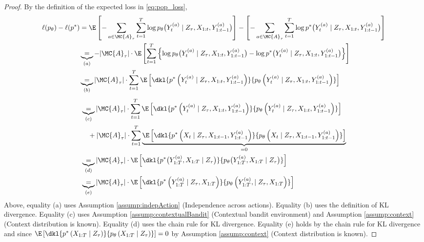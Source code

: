 \begin{proof}
By the definition of the expected loss in  \eqref{eq:pop_loss},
\begin{align*}
    \ell(p_\theta) - \ell(p^*) &= \E \left[ - \sum_{a \in \MC{A}_{\tau}} \sum_{t=1}^T \log p_{\theta} \big( Y_t^{(a)} \mid Z_{\tau}, X_{1:t}, Y_{1:t-1}^{(a)} \big) \right] 
    - \left[ - \sum_{a \in \MC{A}_{\tau}} \sum_{t=1}^T \log p^* \big( Y_t^{(a)} \mid Z_{\tau}, X_{1:t}, Y_{1:t-1}^{(a)} \big) \right] \\
    &\underbrace{=}_{(a)} - |\MC{A}_{\tau}| \cdot \E \left[ \sum_{t=1}^T \left\{ \log p_{\theta} \big( Y_t^{(a)} \mid Z_{\tau}, X_{1:t}, Y_{1:t-1}^{(a)} \big) - \log p^* \big( Y_t^{(a)} \mid Z_{\tau}, X_{1:t}, Y_{1:t-1}^{(a)} \big) \right\} \right] \\
    &\underbrace{=}_{(b)} |\MC{A}_{\tau}| \cdot \sum_{t=1}^T \E \left[ \dkl{p^* \left( Y_t^{(a)} \mid Z_{\tau}, X_{1:t}, Y_{1:t-1}^{(a)} \right)}{p_\theta \left( Y_t^{(a)} \mid Z_{\tau}, X_{1:t}, Y_{1:t-1}^{(a)} \right)} \right] 
\end{align*}
\begin{align*}
    &\underbrace{=}_{(c)} |\MC{A}_{\tau}| \cdot \sum_{t=1}^T \E \left[ \dkl{p^* \left( Y_t^{(a)} \mid Z_{\tau}, X_{1:t}, Y_{1:t-1}^{(a)} \right)}{p_\theta \left( Y_t^{(a)} \mid Z_{\tau}, X_{1:t}, Y_{1:t-1}^{(a)} \right) } \right] \\
    &\quad + |\MC{A}_{\tau}| \cdot \sum_{t=1}^T \underbrace{ \E \left[ \dkl{p^* \left( X_t \mid Z_{\tau}, X_{1:t-1}, Y_{1:t-1}^{(a)} \right)}{p_\theta \left( X_t \mid Z_{\tau}, X_{1:t-1}, Y_{1:t-1}^{(a)} \right)} \right] }_{=0} \\
    &\underbrace{=}_{(d)} |\MC{A}_{\tau}| \cdot \E \left[ \dkl{p^* \big( Y_{1:T}^{(a)}, X_{1:T} \mid Z_{\tau} \big)}{p_\theta \big( Y_{1:T}^{(a)}, X_{1:T} \mid Z_{\tau} \big)} \right] \\
    &\underbrace{=}_{(e)} |\MC{A}_{\tau}| \cdot \E \left[ \dkl{p^* \left( Y_{1:T}^{(a)}\mid Z_{\tau}, X_{1:T} \right)}{p_\theta \left( Y_{1:T}^{(a)}, \mid Z_{\tau}, X_{1:T}  \right)} \right]
\end{align*}
Above, equality (a) uses Assumption \ref{assump:indepAction} (Independence across actions). Equality (b) uses the definition of KL divergence. Equality (c) uses Assumption \ref{assump:contextualBandit} (Contextual bandit environment) and Assumption \ref{assump:context} (Context distribution is known). Equality (d) uses the chain rule for KL divergence. Equality (e) holds by the chain rule for KL divergence and since $\E \left[ \dkl{p^* \left( X_{1:T}\mid Z_{\tau} \right)}{p_\theta \left( X_{1:T} \mid Z_{\tau} \right)} \right] = 0$ by Assumption \ref{assump:context} (Context distribution is known).
\end{proof}

